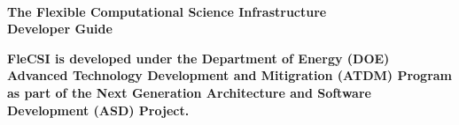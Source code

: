
\begin{titlepage}
\vfill
\begin{center}
\vspace*{2cm}
\\
\vspace{-1.5cm}
\large{\textbf{The Flexible Computational Science Infrastructure}}
\\
\vspace{0.75cm}
\Huge{\textbf{Developer Guide}}
\end{center}
\vfill
\end{titlepage}

\thispagestyle{empty}

{\large
\textbf{FleCSI is developed under the Department of Energy (DOE)
Advanced Technology Development and Mitigration (ATDM) Program as
part of the Next Generation Architecture and Software Development
(ASD) Project.}
}

\vspace{0.25cm}


